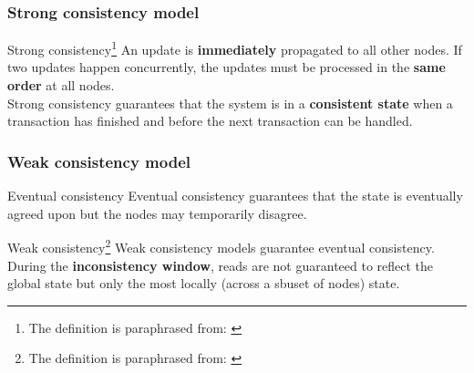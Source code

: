 \documentclass[10pt]{beamer}
\begin{document}
\begin{frame}
  \frametitle{Strong consistency model}
  \begin{alertblock}{Strong consistency\footnote{The definition is paraphrased from: \cite{pedersenConsistencyDistributedPervasive2022}}}
  An update is \textbf{immediately} propagated to all other nodes. If two updates happen concurrently, the updates must be processed in the \textbf{same order} at all nodes.\\
  Strong consistency guarantees that the system is in a \textbf{consistent state} when a transaction has finished and before the next transaction can be handled.
  \end{alertblock}
\end{frame}

\begin{frame}
  \frametitle{Weak consistency model}
  \begin{alertblock}{Eventual consistency \cite{pedersenConsistencyDistributedPervasive2022}}
    Eventual consistency guarantees that the state is eventually agreed upon but the nodes may temporarily disagree.
  \end{alertblock}
  \begin{alertblock}{Weak consistency\footnote{The definition is paraphrased from: \cite{pedersenConsistencyDistributedPervasive2022}}}
    Weak consistency models guarantee eventual consistency. During the \textbf{inconsistency window}, reads are not guaranteed to reflect the global state but only the most locally (across a sbuset of nodes) state.
  \end{alertblock}

\end{frame}
\end{document}
